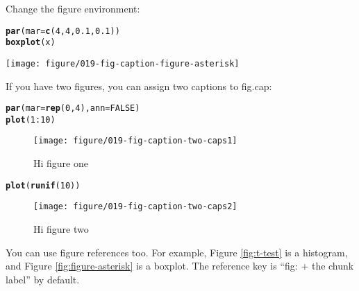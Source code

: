 \documentclass{article}\usepackage[]{graphicx}\usepackage[]{color}
\makeatletter
\def\maxwidth{ %
  \ifdim\Gin@nat@width>\linewidth
    \linewidth
  \else
    \Gin@nat@width
  \fi
}
\newcommand{\hlnum}[1]{\textcolor[rgb]{0.686,0.059,0.569}{#1}}%
\newcommand{\hlopt}[1]{\textcolor[rgb]{0,0,0}{#1}}%
\newcommand{\hlstd}[1]{\textcolor[rgb]{0.345,0.345,0.345}{#1}}%
\newcommand{\hlkwc}[1]{\textcolor[rgb]{0.333,0.667,0.333}{#1}}%
\newcommand{\hlkwd}[1]{\textcolor[rgb]{0.737,0.353,0.396}{\textbf{#1}}}%
\newenvironment{kframe}{%
 \def\at@end@of@kframe{}%
 \ifinner\ifhmode%
  \def\at@end@of@kframe{\end{minipage}}%
  \begin{minipage}{\columnwidth}%
 \fi\fi%
 \def\FrameCommand##1{\hskip\@totalleftmargin \hskip-\fboxsep
 \colorbox{shadecolor}{##1}\hskip-\fboxsep
     \hskip-\linewidth \hskip-\@totalleftmargin \hskip\columnwidth}%
 \MakeFramed {\advance\hsize-\width
   \@totalleftmargin\z@ \linewidth\hsize
   \@setminipage}}%
 {\par\unskip\endMakeFramed%
 \at@end@of@kframe}
\newenvironment{knitrout}{}{} %
\makeatother
\begin{document}
Change the figure environment:

\begin{knitrout}
\color{fgcolor}\begin{kframe}
\begin{alltt}
\hlkwd{par}\hlstd{(}\hlkwc{mar} \hlstd{=} \hlkwd{c}\hlstd{(}\hlnum{4}\hlstd{,} \hlnum{4}\hlstd{,} \hlnum{0.1}\hlstd{,} \hlnum{0.1}\hlstd{))}
\hlkwd{boxplot}\hlstd{(x)}
\end{alltt}
\end{kframe}\begin{figure*}[]

\texttt{[image: figure/019-fig-caption-figure-asterisk]} \caption[Figure * environment]{Figure * environment.\label{fig:figure-asterisk}}
\end{figure*}


\end{knitrout}

If you have two figures, you can assign two captions to fig.cap:

\begin{knitrout}
\color{fgcolor}\begin{kframe}
\begin{alltt}
\hlkwd{par}\hlstd{(}\hlkwc{mar} \hlstd{=} \hlkwd{rep}\hlstd{(}\hlnum{0}\hlstd{,} \hlnum{4}\hlstd{),} \hlkwc{ann} \hlstd{=} \hlnum{FALSE}\hlstd{)}
\hlkwd{plot}\hlstd{(}\hlnum{1}\hlopt{:}\hlnum{10}\hlstd{)}
\end{alltt}
\end{kframe}\begin{figure}[]


{\centering \texttt{[image: figure/019-fig-caption-two-caps1]} 

}

\caption[Hi figure one]{Hi figure one\label{fig:two-caps1}}
\end{figure}

\begin{kframe}\begin{alltt}
\hlkwd{plot}\hlstd{(}\hlkwd{runif}\hlstd{(}\hlnum{10}\hlstd{))}
\end{alltt}
\end{kframe}\begin{figure}[]


{\centering \texttt{[image: figure/019-fig-caption-two-caps2]} 

}

\caption[Hi figure two]{Hi figure two\label{fig:two-caps2}}
\end{figure}


\end{knitrout}

You can use figure references too. For example, Figure \ref{fig:t-test} is a histogram, and Figure \ref{fig:figure-asterisk} is a boxplot. The reference key is ``fig: + the chunk label'' by default.
\end{document}
